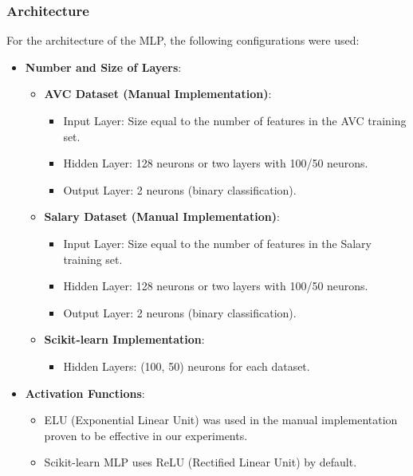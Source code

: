 \documentclass[a4paper,12pt]{article}
\begin{document}
\subsubsection{Architecture}
For the architecture of the MLP, the following configurations were used:
\begin{itemize}
    \item \textbf{Number and Size of Layers}:
    \begin{itemize}
        \item \textbf{AVC Dataset (Manual Implementation)}: 
        \begin{itemize}
            \item Input Layer: Size equal to the number of features in the AVC training set.
            \item Hidden Layer: 128 neurons or two layers with 100/50 neurons.
            \item Output Layer: 2 neurons (binary classification).
        \end{itemize}
        \item \textbf{Salary Dataset (Manual Implementation)}: 
        \begin{itemize}
            \item Input Layer: Size equal to the number of features in the Salary training set.
            \item Hidden Layer: 128 neurons or two layers with 100/50 neurons.
            \item Output Layer: 2 neurons (binary classification).
        \end{itemize}
        \newpage
        \item \textbf{Scikit-learn Implementation}: 
        \begin{itemize}
            \item Hidden Layers: (100, 50) neurons for each dataset.
        \end{itemize}
    \end{itemize}
    \item \textbf{Activation Functions}:
    \begin{itemize}
        \item ELU (Exponential Linear Unit) was used in the manual implementation proven to be effective in our experiments.
        \item Scikit-learn MLP uses ReLU (Rectified Linear Unit) by default.
    \end{itemize}
\end{itemize}
\end{document}
